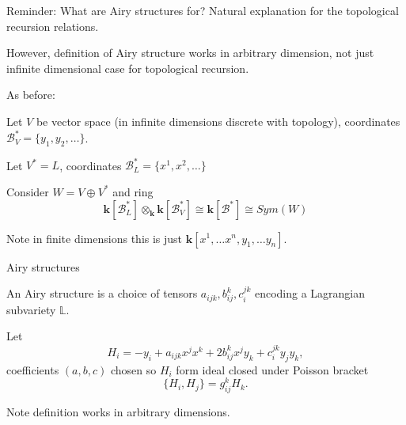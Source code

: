      \frame{\sectionpage}
     
    \begin{frame}{Reminder: What are Airy structures for?}
    Natural explanation for the topological recursion relations.   
    
    However, definition of Airy structure works in arbitrary dimension, not just infinite dimensional case for topological recursion.
    \end{frame}
 
     
    \begin{frame}
    As before: 
    
    Let \(V\) be vector space (in infinite dimensions discrete with topology), coordinates \(\mathcal{B}_V^{*}= \{y_1, y_2, \dots \}\).
    
    Let \(V^* = L\), coordinates \(\mathcal{B}_L^* =  \{x^1, x^2, \dots \}\)
    
    Consider \(W = V \oplus V^{*}\) and ring
    \[  \mathbf{k}[\mathcal{B}_L^*] \otimes_{\mathbf{k}} \mathbf{k} [\mathcal{B}_V^*] \cong \mathbf{k}[\mathcal{B}^*] \cong Sym(W) \]
    
    Note in finite dimensions this is just \( \mathbf{k}[x^1, \dots x^n, y_1, \dots y_n]\).
    \end{frame}

    
    
    \begin{frame}{Airy structures}
        
    
        An Airy structure is a choice of tensors \( a_{ijk}, b_{ij}^k, c_i^{jk}\) encoding a Lagrangian subvariety \(\mathbb{L}\).        
       
        Let         
        \[ H_i = -y_i +  a_{ijk} x^j x^k + 2 b_{ij}^k x^j y_k + c_i^{jk} y_j y_k, \]
        coefficients \((a,b,c)\) chosen so \( H_i  \) form ideal closed under Poisson bracket
        \[ \{ H_i , H_j \} = g_{ij}^k H_k. \]
        
        Note definition works in arbitrary dimensions.
    \end{frame}
    
